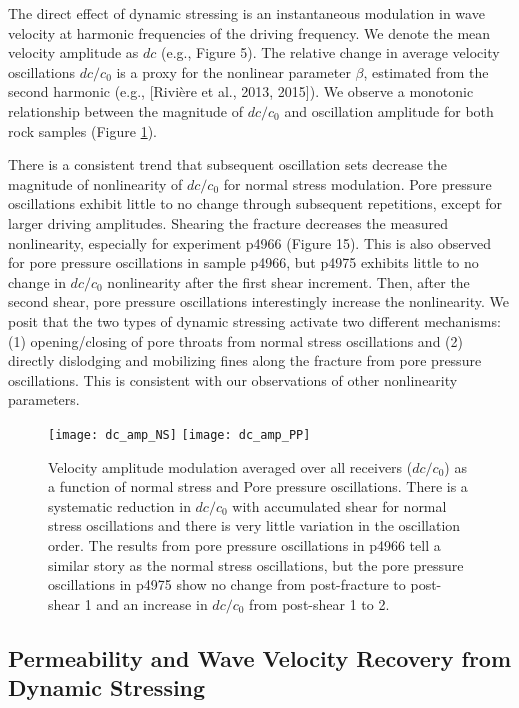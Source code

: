\documentclass[draft]{agujournal2019}
\begin{document}
The direct effect of dynamic stressing is an instantaneous modulation in wave velocity at harmonic frequencies of the driving frequency. We denote the mean velocity amplitude as $ dc $ (e.g., Figure 5). The relative change in average velocity oscillations $ dc/c_0 $ is a proxy for the nonlinear parameter $ \beta $, estimated from the second harmonic (e.g., [Rivi\`ere et al., 2013, 2015]). We observe a monotonic relationship between the magnitude of $ dc/c_0 $ and oscillation amplitude for both rock samples (Figure \ref{fig:dc_plots2}).

There is a consistent trend that subsequent oscillation sets decrease the magnitude of nonlinearity of $ dc/c_0 $ for normal stress modulation. Pore pressure oscillations exhibit little to no change through subsequent repetitions, except for larger driving amplitudes.  Shearing the fracture decreases the measured nonlinearity, especially for experiment p4966 (Figure 15). This is also observed for pore pressure oscillations in sample p4966, but p4975 exhibits little to no change in $ dc/c_0 $ nonlinearity after the first shear increment. Then, after the second shear, pore pressure oscillations interestingly increase the nonlinearity. We posit that the two types of dynamic stressing activate two different mechanisms: (1) opening/closing of pore throats from normal stress oscillations and (2) directly dislodging and mobilizing fines along the fracture from pore pressure oscillations. This is consistent with our observations of other nonlinearity parameters. 
\clearpage

\begin{figure}[ht]
	\centering
	\texttt{[image: dc\_amp\_NS]}
	\texttt{[image: dc\_amp\_PP]}
	\caption{Velocity amplitude modulation averaged over all receivers ($ dc/c_0 $) as a function of normal stress and Pore pressure oscillations. There is a systematic reduction in $ dc/c_0 $ with accumulated shear for normal stress oscillations and there is very little variation in the oscillation order. The results from pore pressure oscillations in p4966 tell a similar story as the normal stress oscillations, but the pore pressure oscillations in p4975 show no change from post-fracture to post-shear 1 and an increase in $ dc/c_0 $ from post-shear 1 to 2.}
	\label{fig:dc_plots2}
\end{figure}
\clearpage

\subsection{Permeability and Wave Velocity Recovery from Dynamic Stressing}
\end{document}
